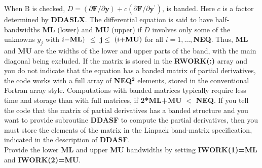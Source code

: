 \documentclass[twoside]{MATH77}
\begin{document}
\begin{description}
  When B is checked, $D=(\partial \mathbf{F}/\partial \mathbf{y})+c
  (\partial \mathbf{F}/\partial \mathbf{y}^{\prime})$, is banded. Here $c$ is a
  factor determined by \textbf{DDASLX}.  The differential equation is said to
  have half-bandwidths \textbf{ML} (lower) and \textbf{MU} (upper) if $D$
  involves only some of the unknowns $y_{j}$ with
  $i\mathbf{-}\text{\textbf{ML}}) $ $\leq$ \textbf{j}$\leq$ $(
  i\mathbf{+}\text{\textbf{MU}}) $ for all $i=1,...,$\textbf{NEQ}.  Thus,
  \textbf{ML} and \textbf{MU} are the widths of the lower and upper parts of the
  band, with the main diagonal being excluded.  If the matrix is stored in the
  \textbf{RWORK(:)} array and you do not indicate that the equation has a banded
  matrix of partial derivatives, the code works with a full array of
  \textbf{NEQ$^\mathbf{2}$} elements, stored in the conventional Fortran array
  style.  Computations with banded matrices typically require less time and
  storage than with full matrices, if \textbf{2*ML+MU} $<$ \textbf{NEQ}.  If you
  tell the code that the matrix of partial derivatives has a banded structure
  and you want to provide subroutine \textbf{DDASF} to compute the partial
  derivatives, then you must store the elements of the matrix in the Linpack
  band-matrix specification, indicated in the description of \textbf{DDASF}.\\
  Provide the lower \textbf{ML} and upper \textbf{MU} bandwidths by setting
  \textbf{IWORK(1)=ML} and \textbf{IWORK(2)=MU}.


\end{description}
\end{document}
